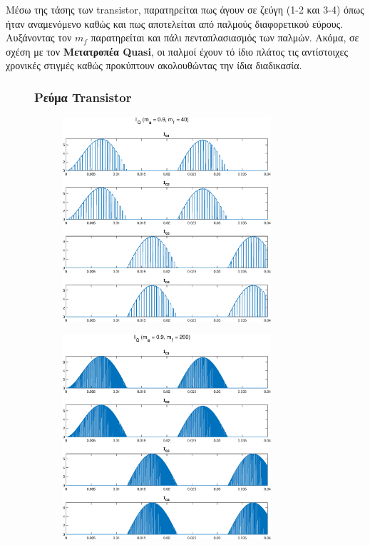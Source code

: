 \noindent
Μέσω της τάσης των transistor, παρατηρείται πως άγουν σε ζεύγη (1-2 και 3-4) όπως ήταν αναμενόμενο καθώς και πως αποτελείται από παλμούς διαφορετικού εύρους. Αυξάνοντας τον $m_f$ παρατηρείται και πάλι πενταπλασιασμός των παλμών. Ακόμα, σε σχέση με τον \textbf{Μετατροπέα Quasi}, οι παλμοί έχουν τό ίδιο πλάτος τις αντίστοιχες χρονικές στιγμές καθώς προκύπτουν ακολουθώντας την ίδια διαδικασία. 
\begin{figure}[h!]
	\subsubsection*{Ρεύμα Transistor}
	\begin{subfigure}{0.49\textwidth}
		\centering
		\includegraphics[width=0.85\textwidth]{Images/I_Q_40}
	\end{subfigure}
	\begin{subfigure}{0.49\textwidth}
		\centering
		\includegraphics[width=0.85\textwidth]{Images/I_Q_200}

\end{subfigure}
\end{figure}

